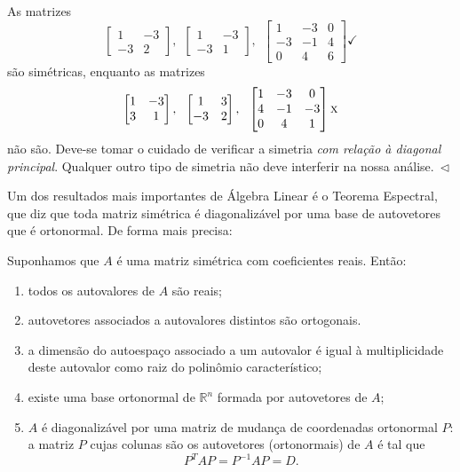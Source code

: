 \begin{ex}
	As matrizes
	\begin{equation}
	\begin{bmatrix}
	1 & -3 \\
	-3 &  2
	\end{bmatrix}, \ \
	\begin{bmatrix}
	1 & -3 \\
	-3 &  1
	\end{bmatrix}, \ \
	\begin{bmatrix}
	1 & -3 & 0 \\
	-3 & -1 & 4 \\
	0 &  4 & 6
	\end{bmatrix} \checkmark
	\end{equation} são simétricas, enquanto  as matrizes
	\begin{equation}
	\begin{bmatrix}
	1 & -3 \\
	3 &  1
	\end{bmatrix},\ \
	\begin{bmatrix}
	1 &  3 \\
	-3 &  2
	\end{bmatrix},\ \
	\begin{bmatrix}
	1 & -3 &  0 \\
	4 & -1 & -3 \\
	0 &  4 &  1
	\end{bmatrix} \textsc{x}
	\end{equation} não são. Deve-se tomar o cuidado de verificar a simetria \textit{com relação à diagonal principal}. Qualquer outro tipo de simetria não deve interferir na nossa análise$. \ \lhd$
\end{ex}

Um dos resultados mais importantes de Álgebra Linear é o Teorema Espectral, que diz que toda matriz simétrica é diagonalizável por uma base de autovetores que é ortonormal. De forma mais precisa:

\begin{teo}\label{teoespectral}
	Suponhamos que $A$ é uma matriz simétrica com coeficientes reais. Então:
	\begin{enumerate}[$(i)$]
		\item todos os autovalores de $A$ são reais;
		\item autovetores associados a autovalores distintos são ortogonais.
		\item a dimensão do autoespaço associado a um autovalor é igual à multiplicidade deste autovalor como raiz do polinômio característico;
		\item existe uma base ortonormal de $\mathbb{R}^n$ formada por autovetores de $A$;
		\item $A$ é diagonalizável por uma matriz de mudança de coordenadas ortonormal $P$: a matriz $P$ cujas colunas são os autovetores (ortonormais) de $A$ é tal que
		\begin{equation}
		P^{T} A P = P^{-1} A P = D.
		\end{equation}
	\end{enumerate}
\end{teo}

